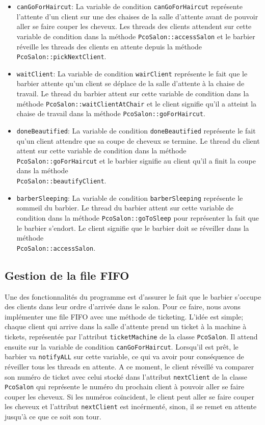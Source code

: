 \documentclass{article}
\begin{document}
\begin{itemize}
    \item \texttt{canGoForHaircut}: La variable de condition \texttt{canGoForHaircut} représente l'attente d'un client sur une des chaises 
    de la salle d'attente avant de pouvoir aller se faire couper les cheveux. Les threads des clients attendent sur cette variable de 
    condition dans la méthode \texttt{PcoSalon::accessSalon} et le barbier réveille les threads des clients en attente depuis la méthode 
    \texttt{PcoSalon::pickNextClient}.
    \item \texttt{waitClient}: La variable de condition \texttt{wairClient} représente le fait que le barbier attente qu'un client se déplace
    de la salle d'attente à la chaise de travail. Le thread du barbier attent sur cette variable de condition dans la méthode \texttt{PcoSalon::waitClientAtChair} et le 
    client signifie qu'il a atteint la chaise de travail dans la méthode \texttt{PcoSalon::goForHaircut}.
    \item \texttt{doneBeautified}: La variable de condition \texttt{doneBeautified} représente le fait qu'un client attendre que sa coupe de
    cheveux se termine. Le thread du client attent sur cette variable de condition dans la méthode \texttt{PcoSalon::goForHaircut} et le 
    barbier signifie au client qu'il a finit la coupe dans la méthode \\ \texttt{PcoSalon::beautifyClient}. 
    \item \texttt{barberSleeping}: La variable de condition \texttt{barberSleeping} représente le sommeil du barbier. Le thread du barbier attent sur cette variable 
    de condition dans la méthode \texttt{PcoSalon::goToSleep} pour représenter la fait que le barbier s'endort. Le 
    client signifie que le barbier doit se réveiller dans la méthode \\ \texttt{PcoSalon::accessSalon}.
\end{itemize}

\subsection*{Gestion de la file FIFO}

Une des fonctionnalités du programme est d'assurer le fait que le barbier s'occupe des clients dans leur ordre d'arrivée dans le salon. Pour ce faire,
nous avons implémenter une file FIFO avec une méthode de ticketing. L'idée est simple; chaque client qui arrive dans la salle d'attente prend un ticket à
la machine à tickets, représentée par l'attribut \texttt{ticketMachine} de la classe \texttt{PcoSalon}. Il attend ensuite sur la variable de condition 
\texttt{canGoForHaircut}. Lorsqu'il est prêt, le barbier va \texttt{notifyALL} sur cette variable, ce qui va avoir pour conséquence de réveiller tous les 
threads en attente. A ce moment, le client réveillé va comparer son numéro de ticket avec celui stocké dans l'attribut \texttt{nextClient} de la 
classe \texttt{PcoSalon} qui représente le numéro du prochain client à pouvoir aller se faire couper les cheveux. Si les numéros coïncident, le client
peut aller se faire couper les cheveux et l'attribut \texttt{nextClient} est incérmenté, sinon, il se remet en attente jusqu'à ce que ce soit son tour.  
\end{document}
